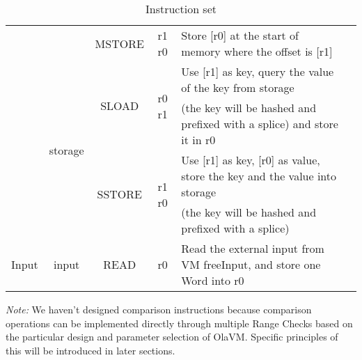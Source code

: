 \begin{table}[!ht]
{\begin{tabular}{|c|c|c|c|l|c|}
    & & MSTORE & r1 r0 & Store [r0] at the start of memory where the offset is [r1] & \\ \cline{2-6}
    & \multirow{4}{*}{storage} & \multirow{2}{*}{SLOAD} & \multirow{2}{*}{r0 r1} & Use [r1] as key, query the value of the key from storage & \\
    & & & & (the key will be hashed and prefixed with a splice) and store it in r0 & \\ \cline{3-6}
    & & \multirow{2}{*}{SSTORE} & \multirow{2}{*}{r1 r0} & Use [r1] as key, [r0] as value, store the key and the value into storage & \\
    & & & & (the key will be hashed and prefixed with a splice) & \\ \hline
    Input & input & READ & r0 & Read the external input from VM freeInput, and store one Word into r0 & \\ \hline
    \end{tabular}
    }
    \caption{Instruction set}
    \label{table:instruction-set}
\end{table}

\emph{Note:} We haven't designed comparison instructions because comparison operations can be implemented directly through multiple Range Checks based on the particular design and parameter selection of OlaVM. Specific principles of this will be introduced in later sections.
